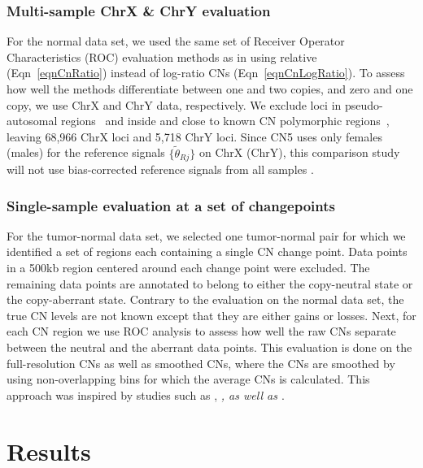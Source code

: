 \documentclass{bioinfo}
\newcommand{\updated}[3][MyDarkRed]{{{\color{#1}\textsl{#2}}\endnote{#3 \color{#1}\textsl{#2}}}\xspace}
\newcommand{\updated}[3][]{#2\xspace}
\begin{document}
\subsubsection{Multi-sample ChrX \& ChrY evaluation}
For the normal data set, we used the same set of Receiver Operator Characteristics (ROC) evaluation methods as in \citet{BengtssonH_etal_2008} using relative (Eqn~\eqref{eqnCnRatio}) instead of log-ratio CNs (Eqn~\eqref{eqnCnLogRatio}).
To assess how well the methods differentiate between one and two copies, and zero and one copy, we use ChrX and ChrY data, respectively.  We exclude loci in pseudo-autosomal regions~\citep{BlaschkeRappold_2006} and inside and close to known CN polymorphic regions~\citep{RedonR_etal_2006}, leaving 68,966 ChrX loci and 5,718 ChrY loci.
Since CN5 uses only females (males) for the reference signals $\{\tilde\theta_{Rj}\}$ on ChrX (ChrY), this comparison study will not use bias-corrected reference signals from all samples \citep{BengtssonH_etal_2008}.

\subsubsection{Single-sample evaluation at a set of changepoints}
For the tumor-normal data set, we selected one tumor-normal pair for which we identified a set of regions each containing a single CN change point.
Data points in a 500kb region centered around each change point were excluded.  The remaining data points are annotated to belong to either the copy-neutral state or the copy-aberrant state.  Contrary to the evaluation on the normal data set, the true CN levels are not known except that they are either gains or losses.
Next, for each CN region we use ROC analysis to assess how well the raw CNs separate between the neutral and the aberrant data points.  This evaluation is done on the full-resolution CNs as well as smoothed CNs, where the CNs are smoothed by using non-overlapping bins for which the average CNs is calculated.
This approach was inspired by studies such as \citet{LaiW_etal_2005}, \citet{WillenbrockFridlyand_2005}\updated{, as well as \citet{BengtssonH_etal_2009a}}{ADDED:}.



 
\section{Results}
\label{secResults}
\end{document}
